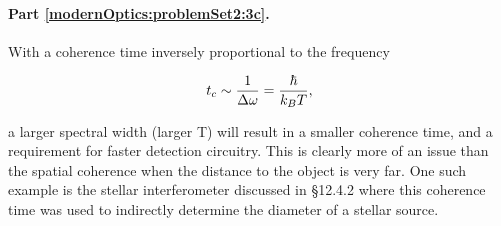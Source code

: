 {%

\paragraph{Part \ref{modernOptics:problemSet2:3c}.  }


With a coherence time inversely proportional to the frequency

\begin{dmath}\label{eqn:modernOptics:ProblemSet2:P3:630}
t_c \sim \inv{\Delta \omega} = \frac{\hbar}{k_B T},
\end{dmath}

a larger spectral width (larger T) will result in a smaller coherence time, and a requirement for faster detection circuitry.  This is clearly more of an issue than the spatial coherence when the distance to the object is very far.  One such example is the stellar interferometer discussed in \citep{hecht1998hecht} \S 12.4.2 where this coherence time was used to indirectly determine the diameter of a stellar source.

}
